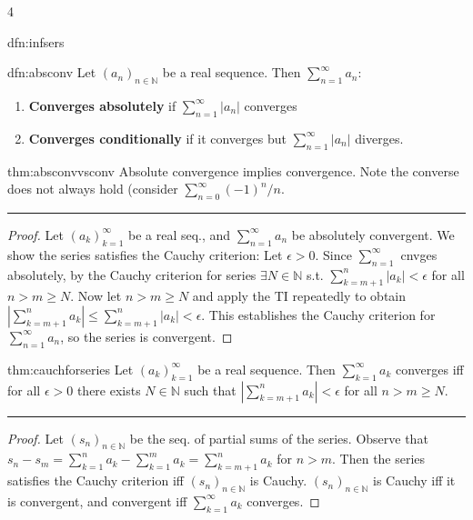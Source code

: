 \documentclass[landscape, 8pt]{extarticle}
\begin{document}
\begin{multicols*}{4}
\begin{mdfn}{dfn:infsers}{ }
		\end{mdfn}
		
		
		\begin{dfn}{dfn:absconv}{ }
			Let $(a_n)_{n \in \mathbb{N}}$ be a real sequence. Then $\sum_{n=1}^{\infty} a_n$:
			\begin{enumerate}[label=(\arabic*)]
				\item \textbf{Converges absolutely} if $\sum_{n=1}^{\infty} \left|a_n\right|$ converges
				\item \textbf{Converges conditionally} if it converges but $\sum_{n=1}^{\infty}\left|a_n\right|$ diverges.
			\end{enumerate}
			
		\end{dfn}
		
		
		\begin{thm}{thm:absconvvsconv}{ }
			Absolute convergence implies convergence. Note the converse does not always hold (consider $\sum_{n=0}^{\infty} (-1)^n/n$.
			\vspace{1pt}
			\hrule	
			\vspace{-6pt}
			\begin{proof}
				Let $(a_k)_{k=1}^\infty$ be a real seq., and $\sum_{n=1}^{\infty}a_n$ be absolutely convergent. We show the series satisfies the Cauchy criterion: Let $\epsilon > 0$. Since $\sum_{n=1}^\infty$ cnvges absolutely, by the Cauchy criterion for series $\exists N\in \mathbb{N}$ s.t. $\sum_{k=m+1}^{n}\left|a_k\right| <\epsilon$ for all $n > m \ge N$. Now let $n > m \ge N$ and apply the TI repeatedly to obtain $\left|\sum_{k=m+1}^n a_k\right| \le \sum_{k=m+1}^n \left|a_k\right| <\epsilon$. This establishes the Cauchy criterion for $\sum_{n=1}^\infty a_n$, so the series is convergent.
			\end{proof}
			
		\end{thm}
		
		
		\begin{mthm}{thm:cauchforseries}{ }
		Let $(a_k)_{k=1}^\infty$ be a real sequence. Then $\sum_{k=1}^{\infty}a_k$ converges iff for all $\epsilon > 0$ there exists $N \in \mathbb{N}$ such that $\left|\sum_{k=m+1}^{n}a_k\right| <\epsilon$ for all $n > m \ge N$.
		\vspace{1pt}
		\hrule	
		\vspace{-6pt}
		\begin{proof}
			Let $(s_n)_{n\in \mathbb{N}}$ be the seq. of partial sums of the series. Observe that $s_n - s_m = \sum_{k=1}^{n}a_k - \sum_{k=1}^{m}a_k = \sum_{k=m+1}^{n}a_k$ for $n > m$. Then the series satisfies the Cauchy criterion iff $(s_n)_{n\in \mathbb{N}}$ is Cauchy. $(s_n)_{n\in \mathbb{N}}$ is Cauchy iff it is convergent, and convergent iff $\sum_{k=1}^{\infty}a_k$ converges.
		\end{proof}
		

\end{mthm}
\end{multicols*}
\end{document}
